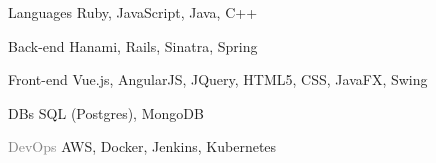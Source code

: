 

\begin{cvskills}


  \cvskill
    {Languages} %
    {Ruby, JavaScript, Java, C++} %

  \cvskill
    {Back-end} %
    {Hanami, Rails, Sinatra, Spring} %

  \cvskill
    {Front-end} %
    {Vue.js, AngularJS, JQuery, HTML5, CSS, JavaFX, Swing} %
	
	  
  \cvskill
    {DBs} %
    {SQL (Postgres), MongoDB} %


  \cvskill
    {\textcolor{gray}{DevOps}} %
    {AWS, Docker, Jenkins, Kubernetes} %

\end{cvskills}
